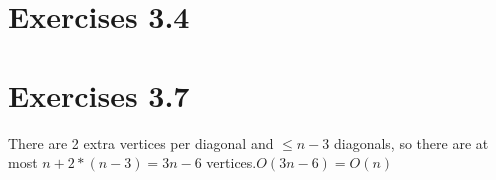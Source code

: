 \documentclass[12pt]{article}
\begin{document}
\section{Exercises 3.4}

\section{Exercises 3.7}
There are 2 extra vertices  per diagonal and $\leq n-3$ diagonals, so there are at most  $n+2*(n-3)=3n-6$ vertices.$O(3n-6) = O(n)$
\end{document}
